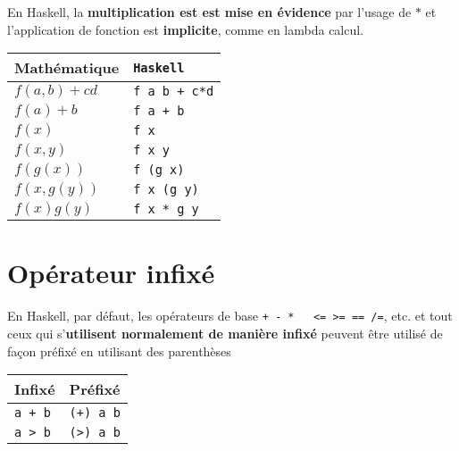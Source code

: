 \documentclass{report}
\begin{document}
\begin{multicols*}{3}
En Haskell, la \textbf{multiplication est est mise en évidence}
par l'usage de $*$ et l'application de fonction est 
\textbf{implicite}, comme en lambda calcul.   

\begin{table}[H]
  \begin{center}
    \renewcommand{\arraystretch}{1.5}
    \selectfont
    \footnotesize
        \begin{tabular}{l|l}
        \arrayrulecolor{white}\hline
        \rowcolor{white}
        \textcolor{myb}{Mathématique} & \textcolor{myb}{\texttt{Haskell}}
        \\
        \hline
        \arrayrulecolor{black}
        $f(a, b) + c d$ & \texttt{f a b + c*d}  
        \\
        $f(a) + b$ & \texttt{f a + b}
        \\ 
        $f(x)$ & \texttt{f x}  
        \\
        $f(x, y)$ & \texttt{f x y}  
        \\ 
        $f(g(x))$ & \texttt{f (g x)}
        \\ 
        $f(x, g(y))$ & \texttt{f x (g y) }  
        \\ 
        $f(x) g(y)$ & \texttt{f x * g y}  
        \end{tabular}
\end{center}
\end{table}


\section{Opérateur infixé}
En Haskell, par défaut, les opérateurs de 
base \texttt{+ - * \ < > <= >= == /=}, etc. et tout ceux qui 
s'\textbf{utilisent normalement de manière infixé} peuvent 
être utilisé de façon préfixé en utilisant des parenthèses  


\begin{table}[H]
  \begin{center}
    \renewcommand{\arraystretch}{1.5}
    \selectfont
    \footnotesize
        \begin{tabular}{l|l}
        \arrayrulecolor{white}\hline
        \rowcolor{white}
        \textcolor{myb}{Infixé} & \textcolor{myb}{Préfixé}
        \\
        \hline
        \arrayrulecolor{black}
        \texttt{a + b} 
        &
        \texttt{(+) a b}  
        \\
        \texttt{a > b} 
        &
        \texttt{(>) a b}  
        \\
        \end{tabular}
\end{center}
\end{table}



\end{multicols*}
\end{document}
